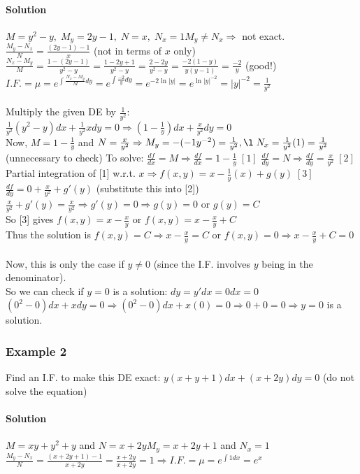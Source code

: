 \documentclass{article}
\begin{document}
\paragraph{Solution} $M=y^2-y,\;M_y=2y-1,\;N=x,\;N_x=1$\qquad $M_y\neq N_x\Rightarrow$ not exact.
\\$\frac{M_y-N_x}{N}=\frac{(2y-1)-1}{x}$ (not in terms of $x$ only)
\\$\frac{N_x-M_y}{M}=\frac{1-(2y-1)}{y^2-y}=\frac{1-2y+1}{y^2-y}=\frac{2-2y}{y^2-y}=\frac{-2(1-y)}{y(y-1)}=\frac{-2}{y}$ (good!)
\\$I.F.=\mu=e^{\int\frac{N_x-M_y}{M}dy}=e^{\int\frac{-2}{y}dy}=e^{-2\ln|y|}=e^{\ln|y|^{-2}}=|y|^{-2}=\frac{1}{y^2}$
\\\\Multiply the given DE by $\frac{1}{y^2}$: $\frac{1}{y^2}(y^2-y)dx+\frac{1}{y^2}xdy=0\Rightarrow(1-\frac{1}{y})dx+\frac{x}{y^2}dy=0$
\\Now, $M=1-\frac{1}{y}$ and $N=\frac{x}{y^2}\Rightarrow M_y=-(-1y^{-2})=\frac{1}{y^2},\l\;N_x=\frac{1}{y^2}(1)=\frac{1}{y^2}$ (unnecessary to check)
\newpage To solve: $\frac{df}{dx}=M\Rightarrow\frac{df}{dx}=1-\frac{1}{y}\;[1]$
\qquad $\frac{df}{dy}=N\Rightarrow\frac{df}{dy}=\frac{x}{y^2}\;[2]$
\\Partial integration of [1] w.r.t. $x\Rightarrow f(x,y)=x-\frac{1}{y}(x)+g(y)\;[3]$
\\$\frac{df}{dy}=0+\frac{x}{y^2}+g'(y)$ (substitute this into [2])
\\$\frac{x}{y^2}+g'(y)=\frac{x}{y^2}\Rightarrow g'(y)=0\Rightarrow g(y)=0$ or $g(y)=C$
\\So [3] gives $f(x,y)=x-\frac{x}{y}$ or $f(x,y)=x-\frac{x}{y}+C$
\\Thus the solution is $f(x,y)=C\Rightarrow x-\frac{x}{y}=C$ or $f(x,y)=0\Rightarrow x-\frac{x}{y}+C=0$
\\\\Now, this is only the case if $y\neq0$ (since the I.F. involves $y$ being in the denominator).
\\So we can check if $y=0$ is a solution: $dy=y'dx=0dx=0$
\\$(0^2-0)dx+xdy=0\Rightarrow(0^2-0)dx+x(0)=0\Rightarrow0+0=0\Rightarrow y=0$ is a solution.

\subsubsection{Example 2}
Find an I.F. to make this DE exact: $y(x+y+1)dx+(x+2y)dy=0$ (do not solve the equation)
\paragraph{Solution}
$M=xy+y^2+y$ and $N=x+2y$\qquad $M_y=x+2y+1$ and $N_x=1$
\\$\frac{M_y-N_x}{N}=\frac{(x+2y+1)-1}{x+2y}=\frac{x+2y}{x+2y}=1\Rightarrow I.F.=\mu=e^{\int 1dx}=e^x$
\end{document}
